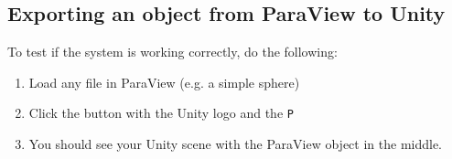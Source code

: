 \subsection{Exporting an object from ParaView to Unity}
To test if the system is working correctly, do the following:

\begin{enumerate}
	\item Load any file in ParaView (e.g. a simple sphere)
	\item Click the button with the Unity logo and the \texttt{P}
	\item You should see your Unity scene with the ParaView object in the middle.
\end{enumerate}